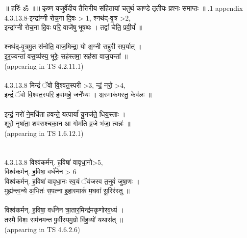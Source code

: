 \documentclass[17pt]{extarticle}
\begin{document}
        
        ॥ हरिः॑ ॐ ॥॥ कृष्ण यजुर्वेदीय तैत्तिरीय संहितायां चतुर्थ काण्डे तृतीयः प्रश्नः समाप्तः ॥ \newline
        .1   appendix\\4.3.13.8-इन्द्रा᳚ग्नी रोच॒ना दि॒वः > 1, श्नथ॑द्-वृ॒त्र >2, \\इन्द्रा᳚ग्नी रोच॒ना दि॒वः परि॒ वाजे॑षु भूषथः । तद्वां᳚ चेति॒ प्रवी॒र्यं᳚ ॥\\\\श्नथ॑द्-वृ॒त्रमु॒त स॑नोति॒ वाज॒मिन्द्रा॒ यो अ॒ग्नी सहु॑री सप॒र्यात् । \\इ॒र॒ज्यन्ता॑ वस॒व्य॑स्य॒ भूरेः॒ सह॑स्तमा॒ सह॑सा वाज॒यन्ता᳚ ॥\\(appearing in TS 4.2.11.1) \\\\4.3.13.8 मिन्द्रं॑ ॅवो वि॒श्वत॒स्परी >3, न्द्रं॒ नरो॒ >4, \\इन्द्रं॑ ॅवो वि॒श्वत॒स्परि॒ हवा॑महे॒ जने᳚भ्यः । अ॒स्माक॑मस्तु॒ केव॑लः ॥ \\\\इन्द्रं॒ नरो॑ ने॒मधि॑ता हवन्ते॒ यत्पार्या॑ यु॒नज॑ते॒ धिय॒स्ताः ।\\शूरो॒ नृषा॑ता॒ शव॑सश्चका॒न आ गोम॑ति व्र॒जे भ॑जा॒ त्वन्नः॑ ॥\\(appearing in TS 1.6.12.1)\\\\\\4.3.13.8 विश्व॑कर्मन्. ह॒विषा॑ वावृधा॒नो>5, \\विश्व॑कर्मन्. ह॒विषा॒ वर्ध॑नेन > 6 \\विश्व॑कर्मन्. ह॒विषा॑ वावृधा॒नः स्व॒यं ॅय॑जस्व त॒नुवं॑ जुषा॒णः ।\\मुह्य॑न्त्व॒न्ये अ॒भितः॑ स॒पत्ना॑ इ॒हास्माकं॑ म॒घवा॑ सू॒रिर॑स्तु ॥\\\\विश्व॑कर्मन्. ह॒विषा॒ वर्ध॑नेन त्रा॒तार॒मिन्द्र॑मकृणोरव॒ध्यं ।\\तस्मै॒ विशः॒ सम॑नमन्त पू॒र्वीर॒यमु॒ग्रो वि॑ह॒व्यो॑ यथास॑त् ॥\\(appearing in TS 4.6.2.6)\\
                \pagebreak
        
\end{document}
